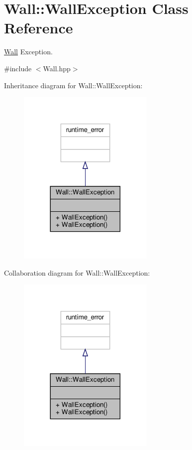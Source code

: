 \hypertarget{class_wall_1_1_wall_exception}{}\section{Wall\+:\+:Wall\+Exception Class Reference}
\label{class_wall_1_1_wall_exception}


\hyperlink{class_wall}{Wall} Exception.  




{\ttfamily \#include $<$Wall.\+hpp$>$}



Inheritance diagram for Wall\+:\+:Wall\+Exception\+:
\nopagebreak
\begin{figure}[H]
\begin{center}
\leavevmode
\includegraphics[width=185pt]{class_wall_1_1_wall_exception__inherit__graph}
\end{center}
\end{figure}


Collaboration diagram for Wall\+:\+:Wall\+Exception\+:
\nopagebreak
\begin{figure}[H]
\begin{center}
\leavevmode
\includegraphics[width=185pt]{class_wall_1_1_wall_exception__coll__graph}
\end{center}
\end{figure}
